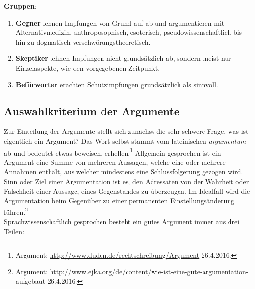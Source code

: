 \documentclass[
    a4paper,
    12pt,
    hyphens,
    chapterprefix=true,
    headheight=33pt,
    footheight=29pt,
    headings=optiontohead, %
]{scrartcl}
\begin{document}
\textbf{Gruppen}:
 \begin{enumerate}
   \item{\textbf{Gegner} lehnen Impfungen von Grund auf ab und argumentieren mit Alternativmedizin, anthroposophisch, esoterisch, pseudowissenschaftlich bis hin zu dogmatisch-verschwörungstheoretisch.}
  \item{\textbf{Skeptiker} lehnen Impfungen nicht grundsätzlich ab, sondern meist nur Einzelaspekte, wie den vorgegebenen Zeitpunkt.}
  \item{\textbf{Befürworter} erachten Schutzimpfungen grundsätzlich als sinnvoll.}
 \end{enumerate}

\subsection{Auswahlkriterium der Argumente}
Zur Einteilung der Argumente stellt sich zunächst die sehr schwere Frage, was ist eigentlich ein Argument? Das Wort selbst stammt vom lateinischen \textit{argumentum} ab und bedeutet etwas beweisen, erhellen.\footnote{Argument: \url{http://www.duden.de/rechtschreibung/Argument} 26.4.2016.} Allgemein gesprochen ist ein Argument eine Summe von mehreren Aussagen, welche eine oder mehrere Annahmen enthält, aus welcher mindestens eine Schlussfolgerung gezogen wird. Sinn oder Ziel einer Argumentation ist es, den Adressaten von der Wahrheit oder Falschheit einer Aussage, eines Gegenstandes zu überzeugen. Im Idealfall wird die Argumentation beim Gegenüber zu einer permanenten Einstellungsänderung führen.\footnote{Argument: http://www.ejka.org/de/content/wie-ist-eine-gute-argumentation-aufgebaut 26.4.2016.} \\
Sprachwissenschaftlich gesprochen besteht ein gutes Argument immer aus drei Teilen:\\ 
\end{document}
